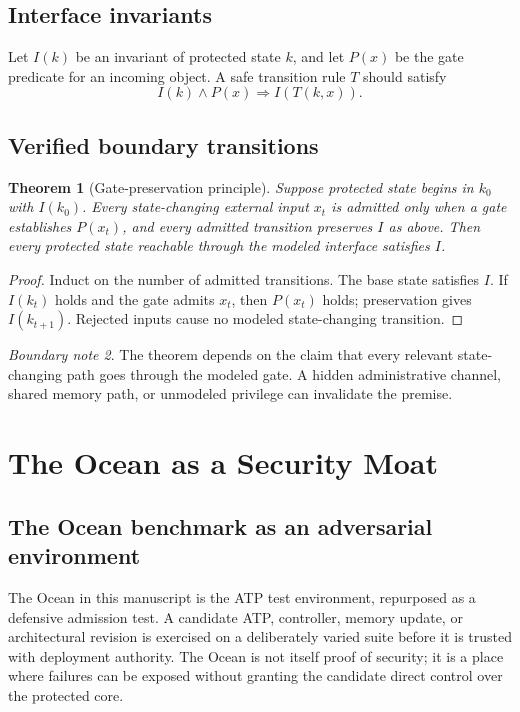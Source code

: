 \documentclass[11pt,oneside]{book}
\newtheorem{theorem}{Theorem}[chapter]
\theoremstyle{definition}
\theoremstyle{remark}
\newtheorem{boundary}[theorem]{Boundary note}
\begin{document}
\section{Interface invariants}
Let $I(k)$ be an invariant of protected state $k$, and let $P(x)$ be the gate predicate for an incoming object. A safe transition rule $T$ should satisfy
\[
I(k)\land P(x)\Rightarrow I(T(k,x)).
\]

\section{Verified boundary transitions}
\label{sec:gate-preservation}
\begin{theorem}[Gate-preservation principle]
Suppose protected state begins in $k_0$ with $I(k_0)$. Every state-changing external input $x_t$ is admitted only when a gate establishes $P(x_t)$, and every admitted transition preserves $I$ as above. Then every protected state reachable through the modeled interface satisfies $I$.
\end{theorem}

\begin{proof}
Induct on the number of admitted transitions. The base state satisfies $I$. If $I(k_t)$ holds and the gate admits $x_t$, then $P(x_t)$ holds; preservation gives $I(k_{t+1})$. Rejected inputs cause no modeled state-changing transition.
\end{proof}

\begin{boundary}
The theorem depends on the claim that every relevant state-changing path goes through the modeled gate. A hidden administrative channel, shared memory path, or unmodeled privilege can invalidate the premise.
\end{boundary}

\chapter{The Ocean as a Security Moat}
\label{ch:ocean}
\section{The Ocean benchmark as an adversarial environment}
The Ocean in this manuscript is the ATP test environment, repurposed as a defensive admission test. A candidate ATP, controller, memory update, or architectural revision is exercised on a deliberately varied suite before it is trusted with deployment authority. The Ocean is not itself proof of security; it is a place where failures can be exposed without granting the candidate direct control over the protected core.
\end{document}
